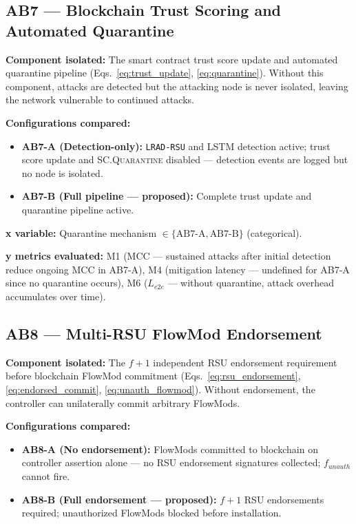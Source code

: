 \documentclass[12pt, a4paper]{report}
\begin{document}
{{\subsection{AB7 — Blockchain Trust Scoring and
Automated Quarantine}
\label{sec:ab7}

\textbf{Component isolated:}
The smart contract trust score update and automated
quarantine pipeline (Eqs.~\ref{eq:trust_update},
\ref{eq:quarantine}). Without this component,
attacks are detected but the attacking node is never
isolated, leaving the network vulnerable to continued
attacks.

\textbf{Configurations compared:}
\begin{itemize}
    \item \textbf{AB7-A (Detection-only):}
    \texttt{LRAD-RSU} and \ac{LSTM} detection active;
    trust score update and \textsc{SC.Quarantine}
    disabled — detection events are logged but no
    node is isolated.
    \item \textbf{AB7-B (Full pipeline — proposed):}
    Complete trust update and quarantine pipeline active.
\end{itemize}

\textbf{x variable:} Quarantine mechanism
$\in \{\text{AB7-A}, \text{AB7-B}\}$ (categorical).

\textbf{y metrics evaluated:} M1 (MCC — sustained
attacks after initial detection reduce ongoing MCC in
AB7-A), M4 (mitigation latency — undefined for AB7-A
since no quarantine occurs), M6 ($L_{e2e}$ — without
quarantine, attack overhead accumulates over time).


\subsection{AB8 — Multi-RSU FlowMod Endorsement}
\label{sec:ab8}

\textbf{Component isolated:}
The $f{+}1$ independent \ac{RSU} endorsement requirement
before blockchain FlowMod commitment
(Eqs.~\ref{eq:rsu_endorsement},
\ref{eq:endorsed_commit}, \ref{eq:unauth_flowmod}).
Without endorsement, the controller can unilaterally
commit arbitrary FlowMods.

\textbf{Configurations compared:}
\begin{itemize}
    \item \textbf{AB8-A (No endorsement):}
    FlowMods committed to blockchain on controller
    assertion alone — no RSU endorsement signatures
    collected; $f_{unauth}$ cannot fire.
    \item \textbf{AB8-B (Full endorsement —
    proposed):} $f{+}1$ RSU endorsements required;
    unauthorized FlowMods blocked before installation.
\end{itemize}

}}
\end{document}
